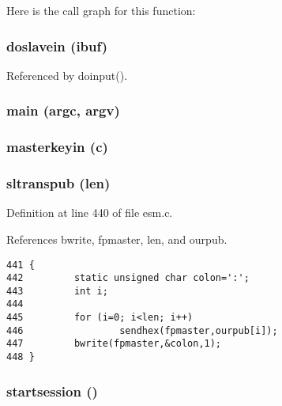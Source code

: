 Here is the call graph for this function:
\subsubsection{\setlength{\rightskip}{0pt plus 5cm}doslavein (ibuf)}\label{esm_8c_a50}




Referenced by doinput().
\subsubsection{\setlength{\rightskip}{0pt plus 5cm}main (argc, {\bf argv})}\label{esm_8c_a48}


\subsubsection{\setlength{\rightskip}{0pt plus 5cm}masterkeyin ({\bf c})}\label{esm_8c_a53}


\subsubsection{\setlength{\rightskip}{0pt plus 5cm}sltranspub ({\bf len})}\label{esm_8c_a52}




Definition at line 440 of file esm.c.

References bwrite, fpmaster, len, and ourpub.



\footnotesize\begin{verbatim}441 {
442         static unsigned char colon=':';
443         int i;
444         
445         for (i=0; i<len; i++)
446                 sendhex(fpmaster,ourpub[i]);
447         bwrite(fpmaster,&colon,1);
448 }
\end{verbatim}\normalsize 
{}
\subsubsection{\setlength{\rightskip}{0pt plus 5cm}startsession ()}\label{esm_8c_a51}




